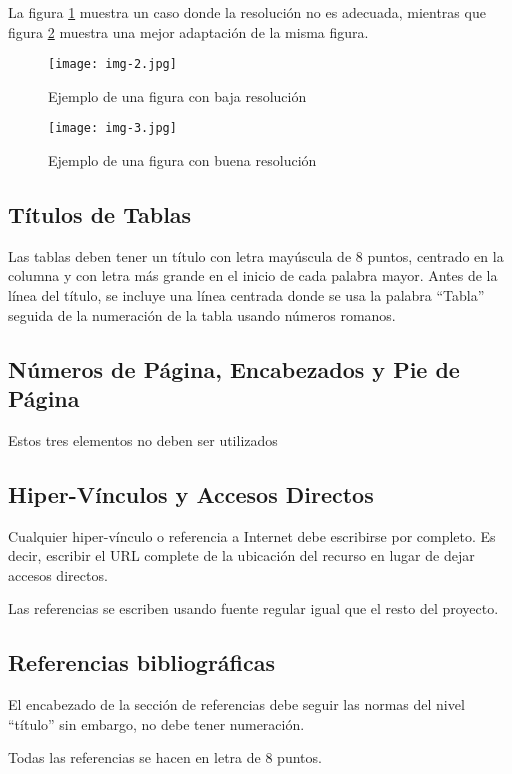 La figura \ref{fig:baja} muestra un caso donde la resolución no es adecuada, mientras
que figura \ref{fig:alta} muestra una mejor adaptación de la misma figura.

\begin{figure}[h]
	\centering
	\texttt{[image: img-2.jpg]}
	\caption{\footnotesize Ejemplo de una figura con baja resolución}
	\label{fig:baja}
\end{figure}

\begin{figure}[h]
	\centering
	\texttt{[image: img-3.jpg]}
	\caption{\footnotesize Ejemplo de una figura con buena resolución}
	\label{fig:alta}
\end{figure}

\subsection{Títulos de Tablas}

Las tablas deben tener un título con letra mayúscula de 8 puntos, centrado en la
columna y con letra más grande en el inicio de cada palabra mayor. Antes de la
línea del título, se incluye una línea centrada donde se usa la palabra “Tabla” seguida
de la numeración de la tabla usando números romanos.

\subsection{Números de Página, Encabezados y Pie de Página}
Estos tres elementos no deben ser utilizados

\subsection{Hiper-Vínculos y Accesos Directos}
Cualquier hiper-vínculo o referencia a Internet debe escribirse por completo. Es
decir, escribir el URL complete de la ubicación del recurso en lugar de dejar
accesos directos.

Las referencias se escriben usando fuente regular igual que el resto del
proyecto.

\subsection{Referencias bibliográficas}
El encabezado de la sección de referencias debe seguir las normas del nivel
“título” sin embargo, no debe tener numeración.

Todas las referencias se hacen en letra de 8 puntos.

